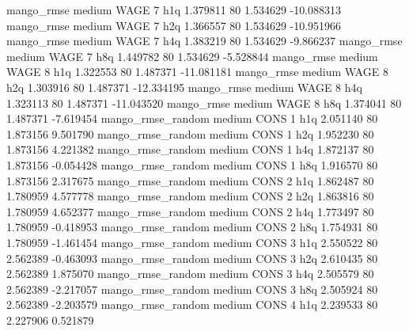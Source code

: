        mango_rmse     medium     WAGE                 7                  h1q  1.379811 80       1.534629         -10.088313
       mango_rmse     medium     WAGE                 7                  h2q  1.366557 80       1.534629         -10.951966
       mango_rmse     medium     WAGE                 7                  h4q  1.383219 80       1.534629          -9.866237
       mango_rmse     medium     WAGE                 7                  h8q  1.449782 80       1.534629          -5.528844
       mango_rmse     medium     WAGE                 8                  h1q  1.322553 80       1.487371         -11.081181
       mango_rmse     medium     WAGE                 8                  h2q  1.303916 80       1.487371         -12.334195
       mango_rmse     medium     WAGE                 8                  h4q  1.323113 80       1.487371         -11.043520
       mango_rmse     medium     WAGE                 8                  h8q  1.374041 80       1.487371          -7.619454
mango_rmse_random     medium     CONS                 1                  h1q  2.051140 80       1.873156           9.501790
mango_rmse_random     medium     CONS                 1                  h2q  1.952230 80       1.873156           4.221382
mango_rmse_random     medium     CONS                 1                  h4q  1.872137 80       1.873156          -0.054428
mango_rmse_random     medium     CONS                 1                  h8q  1.916570 80       1.873156           2.317675
mango_rmse_random     medium     CONS                 2                  h1q  1.862487 80       1.780959           4.577778
mango_rmse_random     medium     CONS                 2                  h2q  1.863816 80       1.780959           4.652377
mango_rmse_random     medium     CONS                 2                  h4q  1.773497 80       1.780959          -0.418953
mango_rmse_random     medium     CONS                 2                  h8q  1.754931 80       1.780959          -1.461454
mango_rmse_random     medium     CONS                 3                  h1q  2.550522 80       2.562389          -0.463093
mango_rmse_random     medium     CONS                 3                  h2q  2.610435 80       2.562389           1.875070
mango_rmse_random     medium     CONS                 3                  h4q  2.505579 80       2.562389          -2.217057
mango_rmse_random     medium     CONS                 3                  h8q  2.505924 80       2.562389          -2.203579
mango_rmse_random     medium     CONS                 4                  h1q  2.239533 80       2.227906           0.521879
